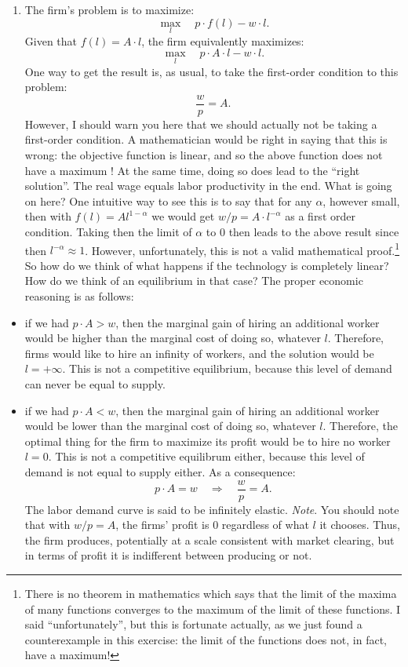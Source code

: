 \documentclass[]{book}
\providecommand{\tightlist}{%
  \setlength{\itemsep}{0pt}\setlength{\parskip}{0pt}}
\let\rmarkdownfootnote\footnote%
\def\footnote{\protect\rmarkdownfootnote}
\begin{document}
\begin{enumerate}
\def\labelenumi{\arabic{enumi}.}
\tightlist
\item
  The firm's problem is to maximize:
  \[\max_l \quad p\cdot f(l)-w\cdot l.\] Given that \(f(l)=A\cdot l\),
  the firm equivalently maximizes:
  \[\max_l \quad p \cdot A\cdot l-w\cdot l.\] One way to get the result
  is, as usual, to take the first-order condition to this problem:
  \[\frac{w}{p}=A.\] However, I should warn you here that we should
  actually not be taking a first-order condition. A mathematician would
  be right in saying that this is wrong: the objective function is
  linear, and so the above function does not have a maximum ! At the
  same time, doing so does lead to the ``right solution''. The real wage
  equals labor productivity in the end. What is going on here? One
  intuitive way to see this is to say that for any \(\alpha\), however
  small, then with \(f(l)=A l^{1-\alpha}\) we would get
  \(w/p=A \cdot l^{-\alpha}\) as a first order condition. Taking then
  the limit of \(\alpha\) to \(0\) then leads to the above result since
  then \(l^{-\alpha} \approx 1\). However, unfortunately, this is not a
  valid mathematical proof.\footnote{There is no theorem in mathematics
    which says that the limit of the maxima of many functions converges
    to the maximum of the limit of these functions. I said
    ``unfortunately'', but this is fortunate actually, as we just found
    a counterexample in this exercise: the limit of the functions does
    not, in fact, have a maximum!} So how do we think of what happens if
  the technology is completely linear? How do we think of an equilibrium
  in that case? The proper economic reasoning is as follows:
\end{enumerate}

\begin{itemize}
\item
  if we had \(p \cdot A>w\), then the marginal gain of hiring an
  additional worker would be higher than the marginal cost of doing so,
  whatever \(l\). Therefore, firms would like to hire an infinity of
  workers, and the solution would be \(l=+\infty\). This is not a
  competitive equilibrium, because this level of demand can never be
  equal to supply.
\item
  if we had \(p \cdot A<w\), then the marginal gain of hiring an
  additional worker would be lower than the marginal cost of doing so,
  whatever \(l\). Therefore, the optimal thing for the firm to maximize
  its profit would be to hire no worker \(l=0\). This is not a
  competitive equilibrum either, because this level of demand is not
  equal to supply either. As a consequence:
  \[p \cdot A=w \quad \Rightarrow \quad \boxed{\frac{w}{p}=A}.\] The
  labor demand curve is said to be infinitely elastic. \emph{Note}. You
  should note that with \(w/p=A\), the firms' profit is \(0\) regardless
  of what \(l\) it chooses. Thus, the firm produces, potentially at a
  scale consistent with market clearing, but in terms of profit it is
  indifferent between producing or not.
\end{itemize}
\end{document}
